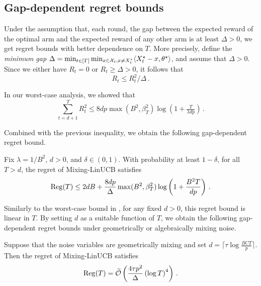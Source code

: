 \subsection{Gap-dependent regret bounds}

Under the assumption that, each round, the gap between the expected reward of the optimal arm and the expected reward of any other arm is at least $\Delta > 0$, we get regret bounds with better dependence on $T$. More precisely, define the \emph{minimum gap} $\Delta = \min_{t \in [T]}\min_{x \in \mathcal{X}_t, x \neq X_t^{\star}}\langle X_t^{\star} - x,\theta^{\star}\rangle$, and assume that $\Delta > 0$. Since we either have $R_t = 0$ or $R_t \geq \Delta > 0$, it follows that
\begin{equation*}
R_t \leq R_t^2/\Delta\,.
\end{equation*}

In our worst-case analysis, we showed that
\begin{equation*}
\sum_{t=d+1}^{T}R_t^2 \leq 8dp\max(B^2, \beta_T^2)\log(1 + \tfrac{T}{\lambda dp})\,.
\end{equation*}

Combined with the previous inequality, we obtain the following gap-dependent regret bound.

\begin{theorem}
Fix $\lambda = 1/B^2$, $d>0$, and $\delta\in(0,1)$. With probability at least $1 - \delta$, for all $T > d$, the regret of Mixing-LinUCB satisfies
\begin{align*}
\mathrm{Reg}(T) \leq 2dB + \frac{8dp}{\Delta}\max(B^2, \beta_{T}^2)\log\left(1 + \frac{B^2T}{dp}\right)\,.
\end{align*}
\label{thm:gap_reg}
\end{theorem}

Similarly to the worst-case bound in , for any fixed $d > 0$, this regret bound is linear in $T$. By setting $d$ as a suitable function of $T$, we obtain the following gap-dependent regret bounds under geometrically or algebraically mixing noise. 

\begin{corollary}
\label{cor2:geometric_mixing}
Suppose that the noise variables are geometrically mixing and set $d = \lceil \tau\log\tfrac{BCT}{p}\rceil$. Then the regret of Mixing-LinUCB satisfies
\begin{align*}
\mathrm{Reg}(T) = \widetilde{\mathcal{O}}\left(\frac{4\tau p^2}{\Delta}\left(\log T\right)^4\right)\,.
\end{align*}
\label{cor:gap_reg_geo}
\end{corollary}

